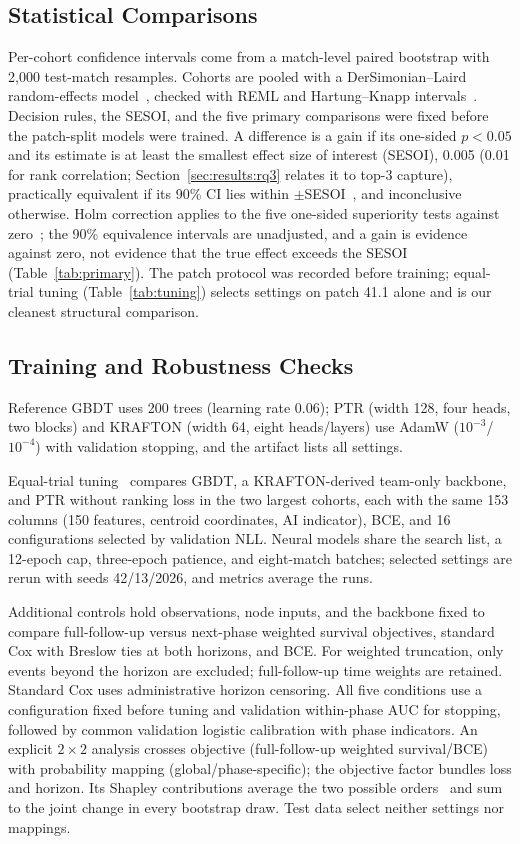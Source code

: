 \documentclass[sigconf,anonymous,nonacm]{acmart}
\begin{document}
\subsection{Statistical Comparisons}
Per-cohort confidence intervals come from a match-level paired bootstrap with 2,000 test-match resamples.
Cohorts are pooled with a DerSimonian--Laird random-effects model~\cite{DerSimonian86}, checked with REML and Hartung--Knapp intervals~\cite{HartungKnapp01}.
Decision rules, the SESOI, and the five primary comparisons were fixed before the patch-split models were trained. A difference is a gain if its one-sided $p<0.05$ and its estimate is at least the smallest effect size of interest (SESOI), 0.005 (0.01 for rank correlation; Section~\ref{sec:results:rq3} relates it to top-3 capture), practically equivalent if its 90\% CI lies within $\pm$SESOI~\cite{Schuirmann87}, and inconclusive otherwise.
Holm correction applies to the five one-sided superiority tests against zero~\cite{Holm79}; the 90\% equivalence intervals are unadjusted, and a gain is evidence against zero, not evidence that the true effect exceeds the SESOI (Table~\ref{tab:primary}). The patch protocol was recorded before training; equal-trial tuning (Table~\ref{tab:tuning}) selects settings on patch 41.1 alone and is our cleanest structural comparison.
\subsection{Training and Robustness Checks}
Reference GBDT uses 200 trees (learning rate 0.06); PTR (width 128, four heads, two blocks) and KRAFTON (width 64, eight heads/layers) use AdamW ($10^{-3}$/$10^{-4}$) with validation stopping, and the artifact lists all settings.

Equal-trial tuning~\cite{Bergstra12,Cawley10} compares GBDT, a KRAFTON-derived team-only backbone, and PTR without ranking loss in the two largest cohorts, each with the same 153 columns (150 features, centroid coordinates, AI indicator), BCE, and 16 configurations selected by validation NLL. Neural models share the search list, a 12-epoch cap, three-epoch patience, and eight-match batches; selected settings are rerun with seeds 42/13/2026, and metrics average the runs.

Additional controls hold observations, node inputs, and the backbone fixed to compare full-follow-up versus next-phase weighted survival objectives, standard Cox with Breslow ties at both horizons, and BCE. For weighted truncation, only events beyond the horizon are excluded; full-follow-up time weights are retained. Standard Cox uses administrative horizon censoring. All five conditions use a configuration fixed before tuning and validation within-phase AUC for stopping, followed by common validation logistic calibration with phase indicators. An explicit $2\times2$ analysis crosses objective (full-follow-up weighted survival/BCE) with probability mapping (global/phase-specific); the objective factor bundles loss and horizon. Its Shapley contributions average the two possible orders~\cite{Shorrocks13} and sum to the joint change in every bootstrap draw. Test data select neither settings nor mappings.
\end{document}
